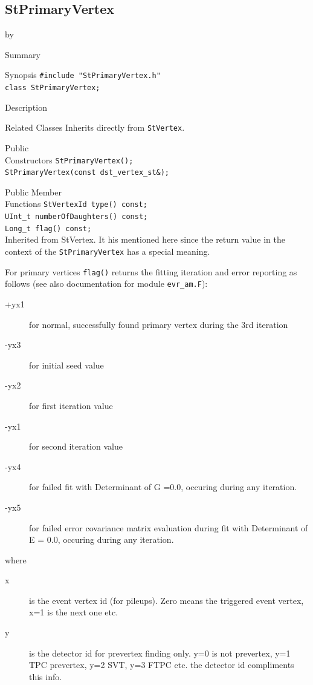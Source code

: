\documentclass[twoside]{article}
\newcommand{\entrylabel}[1]{\mbox{\textbf{{#1}}}\hfil}%
\newenvironment{entry}
{\begin{list}{}%
    {\renewcommand{\makelabel}{\entrylabel}%
     \setlength{\labelwidth}{90pt}%
     \setlength{\leftmargin}{\labelwidth}
     \advance\leftmargin by \labelsep%
      }%
    }%
  {\end{list}}
\newcommand{\Entrylabel}[1]%
{\raisebox{0pt}[1ex][0pt]{\makebox[\labelwidth][l]%
    {\parbox[t]{\labelwidth}{\hspace{0pt}\textbf{{#1}}}}}}
\newenvironment{Entry}%
{\renewcommand{\entrylabel}{\Entrylabel}\begin{entry}}%
  {\end{entry}}
\begin{document}
\subsection{StPrimaryVertex}
\label{sec:StPrimaryVertex}
\begin{Entry}
\item[Summary]
\item[Synopsis]
    \verb+#include "StPrimaryVertex.h"+\\
    \verb+class StPrimaryVertex;+\\
\item[Description]

\item[Related Classes]
    Inherits directly from \texttt{StVertex}.
    
\item[Public\\ Constructors]
    \verb+StPrimaryVertex();+\\
    \verb+StPrimaryVertex(const dst_vertex_st&);+\\

\item[Public Member\\ Functions]
    \verb+StVertexId type() const;+\\
    \verb+UInt_t numberOfDaughters() const;+\\
    

    \verb+Long_t flag() const;+\\
    Inherited from StVertex. It his mentioned here since the return
    value in the context of the \texttt{StPrimaryVertex} has a special
    meaning.
    
    For primary vertices \texttt{flag()} returns the fitting iteration
    and error reporting as follows (see also documentation for module
    \texttt{evr\_am.F}):
    \begin{description}             
    \item[+yx1] for normal, successfully found primary vertex during
        the 3rd iteration
    \item[-yx3] for initial seed value
    \item[-yx2] for first iteration value
    \item[-yx1] for second iteration value
    \item[-yx4] for failed fit with Determinant of G =0.0, occuring
        during any iteration.
    \item[-yx5] for failed error covariance matrix evaluation during
        fit with Determinant of E = 0.0, occuring during any
        iteration.
    \end{description}
    where
    \begin{description}             
    \item[x] is the event vertex id (for pileups). Zero means the
        triggered event vertex, x=1 is the next one etc.
    \item[y] is the detector id for prevertex finding only.  y=0 is not
        prevertex, y=1 TPC prevertex, y=2 SVT, y=3 FTPC etc. the detector id
        compliments this info.
    \end{description}


\end{Entry}
\end{document}
